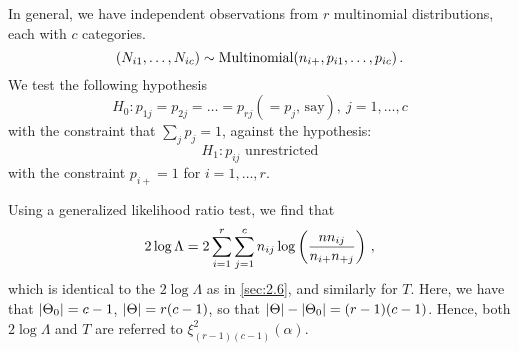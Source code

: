 In general, we have independent observations from $r$ multinomial distributions, each with $c$ categories.
\[
(N_{i1}, \dotsc, N_{ic}) \sim \text{Multinomial}(n_{i+}, p_{i1}, \dotsc, p_{ic}) \, {.}
\]
We test the following hypothesis
\[
H_0 : p_{1j} = p_{2j} = \dotsc = p_{rj} ( = p_j \text{, say}), \ j = 1, \dotsc, c
\]
with the constraint that $\sum_j p_j = 1$, against the hypothesis:
\[
H_1 : p_{ij} \text{ unrestricted}
\]
with the constraint $p_{i+} = 1$ for $i = 1, \dotsc, r$.

Using a generalized likelihood ratio test, we find that
\[
2 \log \Lambda = 2 \sum_{i = 1}^r \sum_{j = 1}^c n_{ij} \log \left( \frac{n n_{ij}}{n_{i+}n_{+j}} \right) \, {,}
\]
which is identical to the $2 \log \Lambda$ as in \cref{sec:2.6}, and similarly for $T$.
Here, we have that $\lvert\Theta_0\rvert = c-1$, $\lvert\Theta\rvert = r(c-1)$, so that $\lvert\Theta\rvert - \lvert\Theta_0\rvert = (r-1)(c-1)$.
Hence, both $2 \log \Lambda$ and $T$ are referred to $\xi^2_{(r-1)(c-1)} (\alpha)$.

